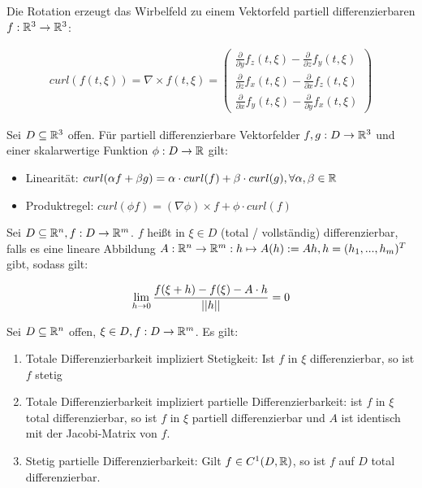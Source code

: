 \begin{definition}[Rotation]
	Die Rotation erzeugt das Wirbelfeld zu einem Vektorfeld partiell differenzierbaren $f : \mathbb{R}^3 \rightarrow \mathbb{R}^3$:
	
	\begin{align*}
	curl(f(t, \xi)) = \nabla \times f(t,\xi) = \begin{pmatrix} \frac{\partial}{\partial y} f_z(t, \xi) - \frac{\partial}{\partial z} f_y(t, \xi) \\
	\frac{\partial}{\partial z} f_x(t, \xi) - \frac{\partial}{\partial x} f_z(t, \xi) \\ \frac{\partial}{\partial x} f_y(t, \xi) - \frac{\partial}{\partial y} f_x(t, \xi)
	\end{pmatrix} 
	\end{align*}
\end{definition}

\begin{satz}
	Sei $D \subseteq \mathbb{R}^3$ offen. Für partiell differenzierbare Vektorfelder $f,g : D \rightarrow \mathbb{R}^3$ und einer skalarwertige Funktion $\phi : D \rightarrow \mathbb{R}$ gilt:
	\begin{itemize}[noitemsep]
		\item Linearität: $curl(\alpha f + \beta g) = \alpha \cdot curl (f) + \beta \cdot curl (g), \forall \alpha, \beta \in \mathbb{R}$
		\item  Produktregel: $curl(\phi f) = (\nabla \phi) \times f + \phi \cdot curl (f)$
	\end{itemize}
\end{satz}


\begin{definition}
	Sei $D \subseteq \mathbb{R}^n, f : D \rightarrow \mathbb{R}^m$. $f$ heißt in $\xi \in D $ (total / vollständig) differenzierbar, falls es eine lineare Abbildung $A : \mathbb{R}^n \rightarrow \mathbb{R}^m : h \mapsto A(h) := Ah, h = (h_1, ..., h_m)^T$ gibt, sodass gilt: 
	
	\begin{align*}
		\lim_{h \rightarrow 0} \frac{f(\xi + h) - f(\xi) - A \cdot h}{||h||} = 0
	\end{align*}
\end{definition}


\begin{satz}
	Sei $D \subseteq \mathbb{R}^n$ offen, $ \xi \in D, f : D \rightarrow \mathbb{R}^m$. Es gilt:
	\begin{enumerate}[noitemsep]
		\item Totale Differenzierbarkeit impliziert Stetigkeit: Ist $f$ in $\xi$ differenzierbar, so ist $f$ stetig
		\item  Totale Differenzierbarkeit impliziert partielle Differenzierbarkeit: ist $f$ in $\xi$ total differenzierbar, so ist $f$ in $\xi$ partiell differenzierbar und $A$ ist identisch mit der Jacobi-Matrix von $f$.
		\item  Stetig partielle Differenzierbarkeit: Gilt $f \in C^1(D,\mathbb{R})$, so ist $f$ auf $D$ total differenzierbar.
	\end{enumerate}
\end{satz}

